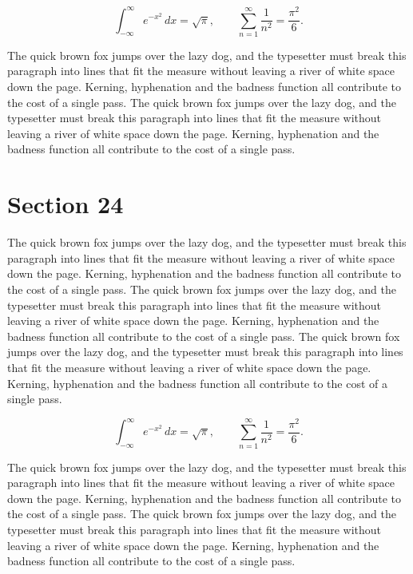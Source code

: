 \documentclass{article}
\begin{document}
\begin{equation}
\int_{-\infty}^{\infty} e^{-x^{2}}\,dx = \sqrt{\pi}, \qquad
\sum_{n=1}^{\infty} \frac{1}{n^{2}} = \frac{\pi^{2}}{6}.
\end{equation}

The quick brown fox jumps over the lazy dog, and the typesetter must break this paragraph into lines that fit the measure without leaving a river of white space down the page. Kerning, hyphenation and the badness function all contribute to the cost of a single pass. The quick brown fox jumps over the lazy dog, and the typesetter must break this paragraph into lines that fit the measure without leaving a river of white space down the page. Kerning, hyphenation and the badness function all contribute to the cost of a single pass. 
\section{Section 24}
The quick brown fox jumps over the lazy dog, and the typesetter must break this paragraph into lines that fit the measure without leaving a river of white space down the page. Kerning, hyphenation and the badness function all contribute to the cost of a single pass. The quick brown fox jumps over the lazy dog, and the typesetter must break this paragraph into lines that fit the measure without leaving a river of white space down the page. Kerning, hyphenation and the badness function all contribute to the cost of a single pass. The quick brown fox jumps over the lazy dog, and the typesetter must break this paragraph into lines that fit the measure without leaving a river of white space down the page. Kerning, hyphenation and the badness function all contribute to the cost of a single pass. 

\begin{equation}
\int_{-\infty}^{\infty} e^{-x^{2}}\,dx = \sqrt{\pi}, \qquad
\sum_{n=1}^{\infty} \frac{1}{n^{2}} = \frac{\pi^{2}}{6}.
\end{equation}

The quick brown fox jumps over the lazy dog, and the typesetter must break this paragraph into lines that fit the measure without leaving a river of white space down the page. Kerning, hyphenation and the badness function all contribute to the cost of a single pass. The quick brown fox jumps over the lazy dog, and the typesetter must break this paragraph into lines that fit the measure without leaving a river of white space down the page. Kerning, hyphenation and the badness function all contribute to the cost of a single pass. 
\end{document}
